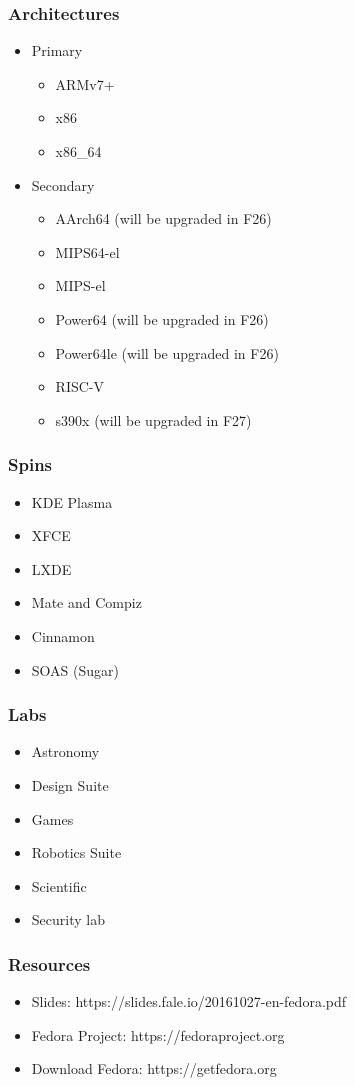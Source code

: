 \documentclass[t,aspectratio=169]{beamer}
\begin{document}
\begin{frame}
    \frametitle{Architectures}
    \begin{itemize}
        \item<2-> Primary
        \begin{itemize}
            \item<3-> ARMv7+
            \item<4-> x86
            \item<5-> x86\_64
        \end{itemize}
        \item<6-> Secondary
        \begin{itemize}
            \item<6-> AArch64 (will be upgraded in F26)
            \item<6-> MIPS64-el
            \item<6-> MIPS-el
            \item<6-> Power64 (will be upgraded in F26)
            \item<6-> Power64le (will be upgraded in F26)
            \item<6-> RISC-V
            \item<6-> s390x (will be upgraded in F27)
        \end{itemize}
    \end{itemize}
\end{frame}

\begin{frame}
    \frametitle{Spins}
    \begin{itemize}
        \item KDE Plasma
        \item XFCE
        \item LXDE
        \item Mate and Compiz
        \item Cinnamon
        \item SOAS (Sugar)
    \end{itemize}
\end{frame}

\begin{frame}
    \frametitle{Labs}
    \begin{itemize}
        \item Astronomy
        \item Design Suite
        \item Games
        \item Robotics Suite
        \item Scientific
        \item Security lab
    \end{itemize}
\end{frame}

\begin{frame}
    \frametitle{Resources}
    \begin{itemize}
        \item Slides: https://slides.fale.io/20161027-en-fedora.pdf
        \item Fedora Project: https://fedoraproject.org
        \item Download Fedora: https://getfedora.org
    \end{itemize}
\end{frame}

\end{document}
